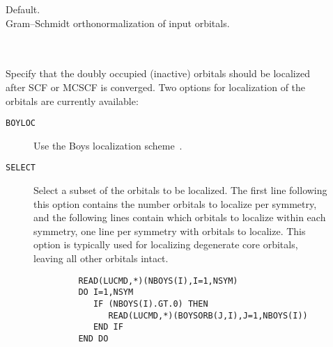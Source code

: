 \begin{description}
\item[]
  Default.\\
  Gram--Schmidt orthonormalization of input orbitals.

\item[] \ \\
   \\
  Specify that the doubly occupied (inactive) orbitals should be localized after SCF 
  or MCSCF is converged.
  Two options for localization of the orbitals are currently available:
  \begin{description}
  \item[{\tt BOYLOC\ }] Use the Boys localization scheme~\cite{Boyloc}.
  \item[{\tt SELECT\ }] Select a subset of the orbitals to be localized. The first
  line following this option contains the number orbitals to localize per symmetry,
  and the following lines contain which orbitals to localize within each symmetry,
  one line per symmetry with orbitals to localize.
  This option is typically used for localizing degenerate 
  core orbitals, leaving all other orbitals intact.
  \begin{verbatim}
         READ(LUCMD,*)(NBOYS(I),I=1,NSYM)
         DO I=1,NSYM
            IF (NBOYS(I).GT.0) THEN
               READ(LUCMD,*)(BOYSORB(J,I),J=1,NBOYS(I))
            END IF
         END DO
   \end{verbatim}
  \end{description}


\end{description}
